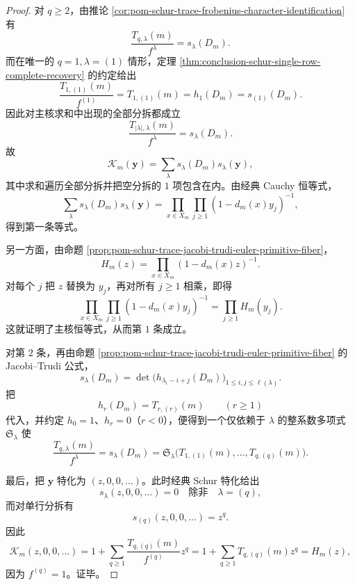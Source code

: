 \begin{proof}
对 \(q\ge 2\)，由推论 \ref{cor:pom-schur-trace-frobenius-character-identification} 有
\[
\frac{T_{q,\lambda}(m)}{f^\lambda}=s_\lambda(D_m).
\]
而在唯一的 \(q=1,\lambda=(1)\) 情形，定理 \ref{thm:conclusion-schur-single-row-complete-recovery} 的约定给出
\[
\frac{T_{1,(1)}(m)}{f^{(1)}}=T_{1,(1)}(m)=h_1(D_m)=s_{(1)}(D_m).
\]
因此对主核求和中出现的全部分拆都成立
\[
\frac{T_{|\lambda|,\lambda}(m)}{f^\lambda}=s_\lambda(D_m).
\]
故
\[
\mathcal K_m(\mathbf y)
=
\sum_{\lambda}s_\lambda(D_m)s_\lambda(\mathbf y),
\]
其中求和遍历全部分拆并把空分拆的 \(1\) 项包含在内。由经典 Cauchy 恒等式，
\[
\sum_{\lambda}s_\lambda(D_m)s_\lambda(\mathbf y)
=
\prod_{x\in X_m}\prod_{j\ge 1}(1-d_m(x)y_j)^{-1},
\]
得到第一条等式。

另一方面，由命题 \ref{prop:pom-schur-trace-jacobi-trudi-euler-primitive-fiber}，
\[
H_m(z)=\prod_{x\in X_m}(1-d_m(x)z)^{-1}.
\]
对每个 \(j\) 把 \(z\) 替换为 \(y_j\)，再对所有 \(j\ge 1\) 相乘，即得
\[
\prod_{x\in X_m}\prod_{j\ge 1}(1-d_m(x)y_j)^{-1}
=
\prod_{j\ge 1}H_m(y_j).
\]
这就证明了主核恒等式，从而第 \(1\) 条成立。

对第 \(2\) 条，再由命题 \ref{prop:pom-schur-trace-jacobi-trudi-euler-primitive-fiber} 的 Jacobi--Trudi 公式，
\[
s_\lambda(D_m)=\det\bigl(h_{\lambda_i-i+j}(D_m)\bigr)_{1\le i,j\le \ell(\lambda)}.
\]
把
\[
h_r(D_m)=T_{r,(r)}(m)
\qquad
(r\ge 1)
\]
代入，并约定 \(h_0=1\)、\(h_r=0\)（\(r<0\)），便得到一个仅依赖于 \(\lambda\) 的整系数多项式 \(\mathfrak S_\lambda\) 使
\[
\frac{T_{q,\lambda}(m)}{f^\lambda}=s_\lambda(D_m)
=
\mathfrak S_\lambda\bigl(T_{1,(1)}(m),\dots,T_{q,(q)}(m)\bigr).
\]

最后，把 \(\mathbf y\) 特化为 \((z,0,0,\dots)\)。此时经典 Schur 特化给出
\[
s_\lambda(z,0,0,\dots)=0
\quad\text{除非}\quad
\lambda=(q),
\]
而对单行分拆有
\[
s_{(q)}(z,0,0,\dots)=z^q.
\]
因此
\[
\mathcal K_m(z,0,0,\dots)
=
1+\sum_{q\ge 1}\frac{T_{q,(q)}(m)}{f^{(q)}}z^q
=
1+\sum_{q\ge 1}T_{q,(q)}(m)z^q
=
H_m(z),
\]
因为 \(f^{(q)}=1\)。证毕。
\end{proof}





